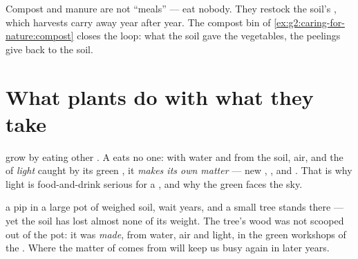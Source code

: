 \begin{remark}\label{rem:g4:what-plants-need:soil}
Compost and manure are not  ``meals'' ---  eat
nobody. They restock the soil's , which harvests
carry away year after year. The compost bin of
\cref{ex:g2:caring-for-nature:compost} closes the loop: what the
soil gave the vegetables, the peelings give back to the soil.
\end{remark}

\section{What plants do with what they take}

\begin{proposition}\label{prop:g4:what-plants-need:make}
 grow by eating other . A  eats no one:
with water and  from the soil, air, and the 
of \emph{light} caught by its green , it \emph{makes its
own matter} --- new , ,  and . That is why
light is food-and-drink serious for a , and why the green
 faces the sky.
\end{proposition}
\admitted

\begin{example}\label{ex:g4:what-plants-need:tree}
 a pip in a large pot of weighed soil, wait years, and a
small tree stands there --- yet the soil has lost almost none of
its weight. The tree's wood was not scooped out of the pot: it
was \emph{made}, from water, air and light, in the green
workshops of the . Where the matter of  comes
from will keep us busy again in later years.
\end{example}

